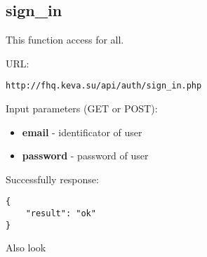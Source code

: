 \subsection{sign\_in}
\par

This function access for all.

URL:
\begin{Verbatim}[frame=single]
http://fhq.keva.su/api/auth/sign_in.php
\end{Verbatim}

Input parameters (GET or POST):
\begin{itemize}
  \item \textbf{email} - identificator of user
  \item \textbf{password} - password of user
\end{itemize}

Successfully response:  \\
\begin{Verbatim}[frame=single]
{
    "result": "ok"
}
\end{Verbatim}

Also look ~
